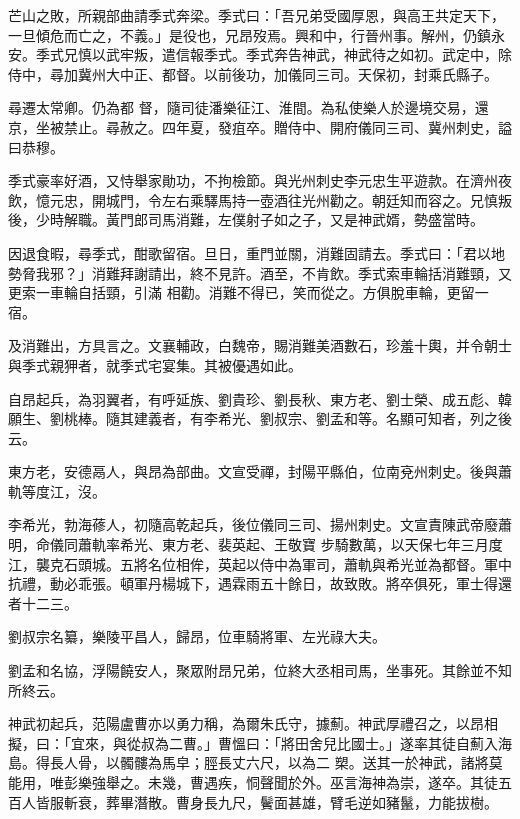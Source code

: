 \begin{pinyinscope}
 芒山之敗，所親部曲請季式奔梁。季式曰：「吾兄弟受國厚恩，與高王共定天下，一旦傾危而亡之，不義。」是役也，兄昂歿焉。興和中，行晉州事。解州，仍鎮永安。季式兄慎以武牢叛，遣信報季式。季式奔告神武，神武待之如初。武定中，除侍中，尋加冀州大中正、都督。以前後功，加儀同三司。天保初，封乘氏縣子。



 尋遷太常卿。仍為都
 督，隨司徒潘樂征江、淮間。為私使樂人於邊境交易，還京，坐被禁止。尋赦之。四年夏，發疽卒。贈侍中、開府儀同三司、冀州刺史，謚曰恭穆。



 季式豪率好酒，又恃舉家勛功，不拘檢節。與光州刺史李元忠生平遊款。在濟州夜飲，憶元忠，開城門，令左右乘驛馬持一壺酒往光州勸之。朝廷知而容之。兄慎叛後，少時解職。黃門郎司馬消難，左僕射子如之子，又是神武婿，勢盛當時。



 因退食暇，尋季式，酣歌留宿。旦日，重門並關，消難固請去。季式曰：「君以地勢脅我邪？」消難拜謝請出，終不見許。酒至，不肯飲。季式索車輪括消難頸，又更索一車輪自括頸，引滿
 相勸。消難不得已，笑而從之。方俱脫車輪，更留一宿。



 及消難出，方具言之。文襄輔政，白魏帝，賜消難美酒數石，珍羞十輿，并令朝士與季式親狎者，就季式宅宴集。其被優遇如此。



 自昂起兵，為羽翼者，有呼延族、劉貴珍、劉長秋、東方老、劉士榮、成五彪、韓願生、劉桃棒。隨其建義者，有李希光、劉叔宗、劉孟和等。名顯可知者，列之後云。



 東方老，安德鬲人，與昂為部曲。文宣受禪，封陽平縣伯，位南兗州刺史。後與蕭軌等度江，沒。



 李希光，勃海蓚人，初隨高乾起兵，後位儀同三司、揚州刺史。文宣責陳武帝廢蕭明，命儀同蕭軌率希光、東方老、裴英起、王敬寶
 步騎數萬，以天保七年三月度江，襲克石頭城。五將名位相侔，英起以侍中為軍司，蕭軌與希光並為都督。軍中抗禮，動必乖張。頓軍丹楊城下，遇霖雨五十餘日，故致敗。將卒俱死，軍士得還者十二三。



 劉叔宗名纂，樂陵平昌人，歸昂，位車騎將軍、左光祿大夫。



 劉孟和名協，浮陽饒安人，聚眾附昂兄弟，位終大丞相司馬，坐事死。其餘並不知所終云。



 神武初起兵，范陽盧曹亦以勇力稱，為爾朱氏守，據薊。神武厚禮召之，以昂相擬，曰：「宜來，與從叔為二曹。」曹慍曰：「將田舍兒比國士。」遂率其徒自薊入海島。得長人骨，以髑髏為馬皁；脛長丈六尺，以為二
 槊。送其一於神武，諸將莫能用，唯彭樂強舉之。未幾，曹遇疾，恫聲聞於外。巫言海神為崇，遂卒。其徒五百人皆服斬衰，葬畢潛散。曹身長九尺，鬢面甚雄，臂毛逆如豬鬣，力能拔樹。




\end{pinyinscope}
